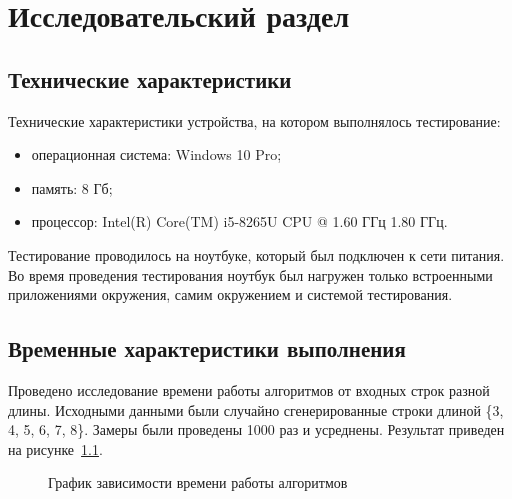 \chapter{Исследовательский раздел}
\section{Технические характеристики}
Технические характеристики устройства, на котором выполнялось тестирование:
\begin{itemize}
	\item операционная система: Windows 10 Pro;
	\item память: 8 Гб;
	\item процессор: Intel(R) Core(TM) i5-8265U CPU @ 1.60 ГГц   1.80 ГГц.
\end{itemize}
Тестирование проводилось на ноутбуке, который был подключен к сети питания. Во время проведения тестирования ноутбук был нагружен только встроенными приложениями окружения, самим окружением и системой тестирования.

\section{Временные характеристики выполнения}
Проведено исследование времени работы алгоритмов от входных строк разной длины. Исходными данными были случайно сгенерированные строки длиной \{3, 4, 5, 6, 7, 8\}. Замеры были проведены 1000 раз и усреднены. Результат приведен на рисунке~\ref{fg:6_1}.
 
\begin{figure}[H]
	\hspace*{-1cm}
	\centering
	\caption{График зависимости времени работы алгоритмов } 
	\label{fg:6_1}
\end{figure} 

